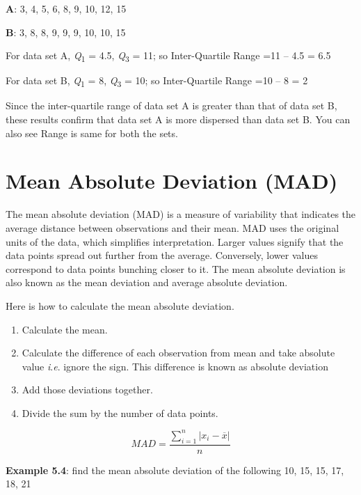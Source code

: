 \documentclass[
]{book}
\begin{document}
\textbf{A}: 3, 4, 5, 6, 8, 9, 10, 12, 15

\textbf{B}: 3, 8, 8, 9, 9, 9, 10, 10, 15

For data set A, \emph{Q}\textsubscript{1} = 4.5, \emph{Q}\textsubscript{3} = 11; so Inter-Quartile Range =11
-- 4.5 = 6.5

For data set B, \emph{Q}\textsubscript{1} = 8, \emph{Q}\textsubscript{3} = 10; so Inter-Quartile Range =10 --
8 = 2

Since the inter-quartile range of data set A is greater than that of
data set B, these results confirm that data set A is more dispersed than
data set B. You can also see Range is same for both the sets.

\section{Mean Absolute Deviation (MAD)}\label{mean-absolute-deviation-mad}

The mean absolute deviation (MAD) is a measure of variability that
indicates the average distance between observations and their mean. MAD
uses the original units of the data, which simplifies interpretation.
Larger values signify that the data points spread out further from the
average. Conversely, lower values correspond to data points bunching
closer to it. The mean absolute deviation is also known as the mean
deviation and average absolute deviation.

Here is how to calculate the mean absolute deviation.

\begin{enumerate}
\def\labelenumi{\arabic{enumi}.}
\item
  Calculate the mean.
\item
  Calculate the difference of each observation from mean and take
  absolute value \emph{i}.\emph{e}. ignore the sign. This difference is known as
  absolute deviation
\item
  Add those deviations together.
\item
  Divide the sum by the number of data points.
\end{enumerate}

\[MAD = \frac{\sum_{i = 1}^{n}\left| x_{i} - \overline{x} \right|}{n}\]

\textbf{Example 5.4}: find the mean absolute deviation of the following 10,
15, 15, 17, 18, 21
\end{document}
